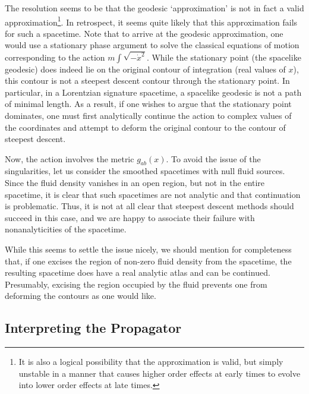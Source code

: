 \documentclass[a4paper,12pt]{article}
\begin{document}
The resolution seems to be that the geodesic `approximation' is not in
fact a valid approximation\footnote{It is also a logical possibility
  that the approximation is valid, but simply unstable in a manner
  that causes higher order effects at early times to evolve into lower
  order effects at late times.}.  In retrospect, it seems quite likely
that this approximation fails for such a spacetime.  Note that to
arrive at the geodesic approximation, one would use a stationary phase
argument to solve the classical equations of motion corresponding to
the action $m \int \sqrt{-\dot{x}^2}$.  While the stationary point
(the spacelike geodesic) does indeed lie on the original contour of
integration (real values of $x$), this contour is not a steepest
descent contour through the stationary point.  In particular, in a
Lorentzian signature spacetime, a spacelike geodesic is not a path of
minimal length.  As a result, if one wishes to argue that the
stationary point dominates, one must first analytically continue the
action to complex values of the coordinates and attempt to deform the
original contour to the contour of steepest descent.

Now, the action involves the metric $g_{ab}(x)$.  To avoid the issue
of the singularities, let us consider the smoothed spacetimes with
null fluid sources.  Since the fluid density vanishes in an open
region, but not in the entire spacetime, it is clear that such
spacetimes are not analytic and that continuation is problematic.
Thus, it is not at all clear that steepest descent methods should
succeed in this case, and we are happy to associate their failure with
nonanalyticities of the spacetime.

While this seems to settle the issue nicely, we should mention for
completeness that, if one excises the region of non-zero fluid density
from the spacetime, the resulting spacetime does have a real analytic
atlas and can be continued.  Presumably, excising the region occupied
by the fluid prevents one from deforming the contours as one would
like.

\subsection{Interpreting the Propagator}
\label{interp}
\end{document}
